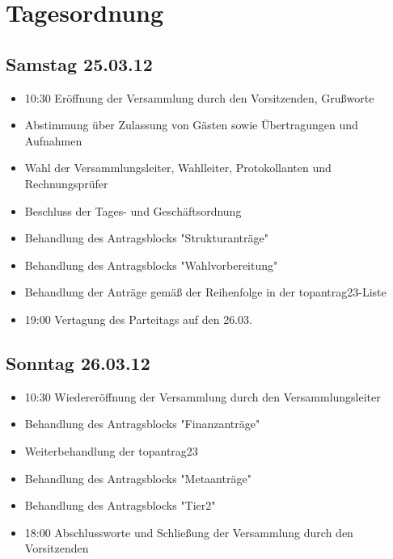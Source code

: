 \chapter{Tagesordnung}

\section{Samstag 25.03.12}
\begin{itemize}
	\item 10:30 Eröffnung der Versammlung durch den Vorsitzenden, Grußworte
	\item Abstimmung über Zulassung von Gästen sowie Übertragungen und Aufnahmen
	\item Wahl der Versammlungsleiter, Wahlleiter, Protokollanten und Rechnungsprüfer
	\item Beschluss der Tages- und Geschäftsordnung
	\item Behandlung des Antragsblocks "Strukturanträge"
	\item Behandlung des Antragsblocks "Wahlvorbereitung" \pageref{Wahlvorbereitung}
	\item Behandlung der Anträge gemäß der Reihenfolge in der topantrag23-Liste
	\item 19:00 Vertagung des Parteitags auf den 26.03.
\end{itemize}
\section{Sonntag 26.03.12}
\begin{itemize}
	\item 10:30 Wiedereröffnung der Versammlung durch den Versammlungsleiter
	\item Behandlung des Antragsblocks "Finanzanträge"
	\item Weiterbehandlung der topantrag23
	\item Behandlung des Antragsblocks "Metaanträge"
	\item Behandlung des Antragsblocks "Tier2"
	\item 18:00 Abschlussworte und Schließung der Versammlung durch den Vorsitzenden
\end{itemize}
\vfill
{}
\newpage


